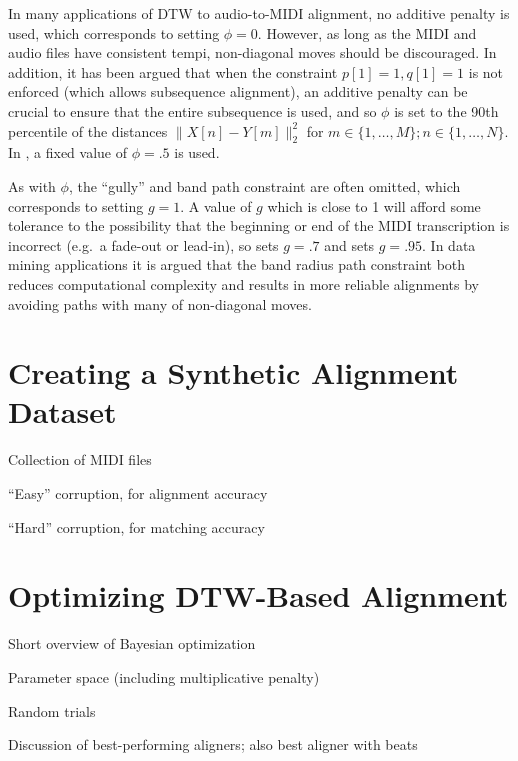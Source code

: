 \documentclass{article}
\begin{document}
\begin{description}[topsep=1pt,itemsep=-1pt,leftmargin=5pt]
\item[Penalty ($\phi$):] In many applications of DTW to audio-to-MIDI alignment, no additive penalty is used, which corresponds to setting $\phi = 0$.
However, as long as the MIDI and audio files have consistent tempi, non-diagonal moves should be discouraged.
In addition, it has been argued \cite{raffel2015large} that when the constraint $p[1] = 1, q[1] = 1$ is not enforced (which allows subsequence alignment), an additive penalty can be crucial to ensure that the entire subsequence is used, and so $\phi$ is set to the 90th percentile of the distances $\|X[n] - Y[m]\|_2^2$ for $m \in \{1, \ldots, M\}; n \in \{1, \ldots, N\}$.
In \cite{ellis2013aligning}, a fixed value of $\phi = .5$ is used.
\item[Gully ($g$) and band path constraint:] As with $\phi$, the ``gully'' and band path constraint are often omitted, which corresponds to setting $g = 1$.
A value of $g$ which is close to 1 will afford some tolerance to the possibility that the beginning or end of the MIDI transcription is incorrect (e.g.\ a fade-out or lead-in), so \cite{ellis2013aligning} sets $g = .7$ and \cite{raffel2015large} sets $g = .95$.
In data mining applications \cite{ratanamahatana2004everything} it is argued that the band radius path constraint both reduces computational complexity and results in more reliable alignments by avoiding paths with many of non-diagonal moves.
\end{description}

\section{Creating a Synthetic Alignment Dataset}
\label{sec:synthetic}

Collection of MIDI files

``Easy'' corruption, for alignment accuracy

``Hard'' corruption, for matching accuracy

\section{Optimizing DTW-Based Alignment}
\label{sec:optimizing}

Short overview of Bayesian optimization

Parameter space (including multiplicative penalty)

Random trials

Discussion of best-performing aligners; also best aligner with beats
\end{document}
